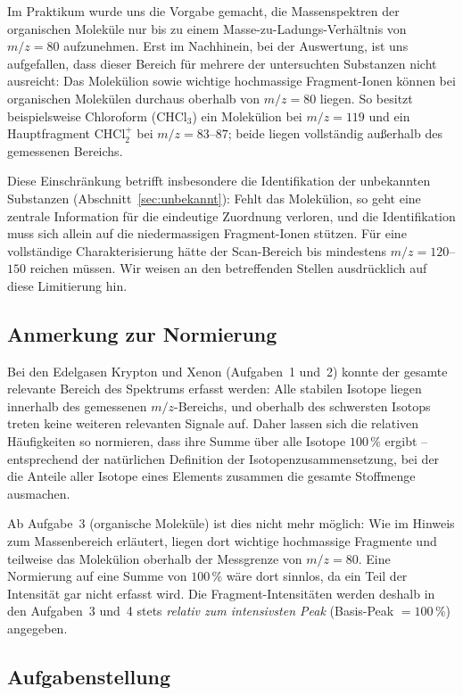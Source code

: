 \documentclass{article}
\begin{document}
Im Praktikum wurde uns die Vorgabe gemacht, die Massenspektren der
organischen Moleküle nur bis zu einem Masse-zu-Ladungs-Verhältnis von
$m/z = 80$ aufzunehmen.
Erst im Nachhinein, bei der Auswertung, ist uns aufgefallen, dass
dieser Bereich für mehrere der untersuchten Substanzen nicht ausreicht:
Das Molekülion sowie wichtige hochmassige Fragment-Ionen können bei
organischen Molekülen durchaus oberhalb von $m/z = 80$ liegen.
So besitzt beispielsweise Chloroform (CHCl$_3$) ein Molekülion bei
$m/z = 119$ und ein Hauptfragment CHCl$_2^+$ bei $m/z = 83$--$87$;
beide liegen vollständig außerhalb des gemessenen Bereichs.

Diese Einschränkung betrifft insbesondere die Identifikation der
unbekannten Substanzen (Abschnitt~\ref{sec:unbekannt}): Fehlt das
Molekülion, so geht eine zentrale Information für die eindeutige
Zuordnung verloren, und die Identifikation muss sich allein auf die
niedermassigen Fragment-Ionen stützen.
Für eine vollständige Charakterisierung hätte der Scan-Bereich bis
mindestens $m/z = 120$--$150$ reichen müssen.
Wir weisen an den betreffenden Stellen ausdrücklich auf diese
Limitierung hin.

\subsection*{Anmerkung zur Normierung}

Bei den Edelgasen Krypton und Xenon (Aufgaben~1 und~2) konnte der
gesamte relevante Bereich des Spektrums erfasst werden: Alle stabilen
Isotope liegen innerhalb des gemessenen $m/z$-Bereichs, und oberhalb
des schwersten Isotops treten keine weiteren relevanten Signale auf.
Daher lassen sich die relativen Häufigkeiten so normieren, dass ihre
Summe über alle Isotope $100\,\%$ ergibt -- entsprechend der natürlichen
Definition der Isotopenzusammensetzung, bei der die Anteile aller Isotope
eines Elements zusammen die gesamte Stoffmenge ausmachen.

Ab Aufgabe~3 (organische Moleküle) ist dies nicht mehr möglich: Wie im
Hinweis zum Massenbereich erläutert, liegen dort wichtige hochmassige
Fragmente und teilweise das Molekülion oberhalb der Messgrenze von
$m/z = 80$. Eine Normierung auf eine Summe von $100\,\%$ wäre dort
sinnlos, da ein Teil der Intensität gar nicht erfasst wird. Die
Fragment-Intensitäten werden deshalb in den Aufgaben~3 und~4 stets
\emph{relativ zum intensivsten Peak} (Basis-Peak $= 100\,\%$) angegeben.


\subsection*{Aufgabenstellung}
\end{document}
